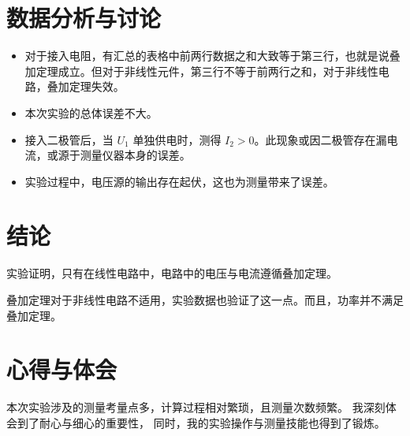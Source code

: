 \documentclass{Report} %
\begin{document}
\begin{table}[H]
\centering
\caption{汇总表}
\label{tab:summary_measured_D1}
\end{table}



\section{数据分析与讨论}
\begin{itemize}
    \item 对于接入电阻，有汇总的表格中前两行数据之和大致等于第三行，也就是说叠加定理成立。但对于非线性元件，第三行不等于前两行之和，对于非线性电路，叠加定理失效。
    \item 本次实验的总体误差不大。
    \item 接入二极管后，当 $U_1$ 单独供电时，测得 $I_2 > 0$。此现象或因二极管存在漏电流，或源于测量仪器本身的误差。
    \item 实验过程中，电压源的输出存在起伏，这也为测量带来了误差。
\end{itemize}

\section{结论}
实验证明，只有在线性电路中，电路中的电压与电流遵循叠加定理。

叠加定理对于非线性电路不适用，实验数据也验证了这一点。而且，功率并不满足叠加定理。

\section{心得与体会}
本次实验涉及的测量考量点多，计算过程相对繁琐，且测量次数频繁。
我深刻体会到了耐心与细心的重要性，
同时，我的实验操作与测量技能也得到了锻炼。
\end{document}
